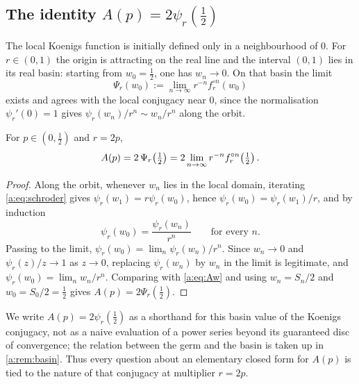 \subsection{The identity \texorpdfstring{$A(p)=2\psi_r(\tfrac12)$}{A(p) = 2 psi(1/2)}}
\label{a:sec:identity}

The local Koenigs function is initially defined only in a neighbourhood of $0$.
For $r\in(0,1)$ the origin is attracting on the real line and the interval $(0,1)$
lies in its real basin: starting from $w_0=\tfrac12$, one has $w_n\to0$. On that
basin the limit
\begin{equation}
\label{a:eq:basinkoenigs}
\Psi_r(w_0) := \lim_{n\to\infty}r^{-n}f_r^{\circ n}(w_0)
\end{equation}
exists and agrees with the local conjugacy near $0$, since the normalisation
$\psi_r'(0)=1$ gives $\psi_r(w_n)/r^n\sim w_n/r^n$ along the orbit.

\begin{proposition}
\label{a:prop:AisKoenigs}
For $p\in(0,\tfrac12)$ and $r=2p$,
\begin{equation}
\label{a:eq:AeqKoenigs}
A(p) = 2\,\Psi_r\!\left(\tfrac12\right)
= 2\lim_{n\to\infty}r^{-n}f_r^{\circ n}\!\left(\tfrac12\right) .
\end{equation}
\end{proposition}

\begin{proof}
Along the orbit, whenever $w_n$ lies in the local domain, iterating
\cref{a:eq:schroder} gives $\psi_r(w_1)=r\psi_r(w_0)$, hence
$\psi_r(w_0)=\psi_r(w_1)/r$, and by induction
\begin{equation}
\label{a:eq:induction}
\psi_r(w_0) = \frac{\psi_r(w_n)}{r^n}\qquad\text{for every }n .
\end{equation}
Passing to the limit, $\psi_r(w_0) = \lim_n\psi_r(w_n)/r^n$. Since $w_n\to0$ and
$\psi_r(z)/z\to1$ as $z\to0$, replacing $\psi_r(w_n)$ by $w_n$ in the limit is
legitimate, and $\psi_r(w_0)=\lim_n w_n/r^n$. Comparing with \cref{a:eq:Aw} and
using $w_n = S_n/2$ and $w_0=S_0/2=\tfrac12$ gives
$A(p) = 2\Psi_r(\tfrac12)$.
\end{proof}

\noindent
We write $A(p)=2\psi_r(\tfrac12)$ as a shorthand for this basin value of the
Koenigs conjugacy, not as a naive evaluation of a power series beyond its
guaranteed disc of convergence; the relation between the germ and the basin is
taken up in \cref{a:rem:basin}. Thus every question about an elementary closed
form for $A(p)$ is tied to the nature of that conjugacy at multiplier $r=2p$.


